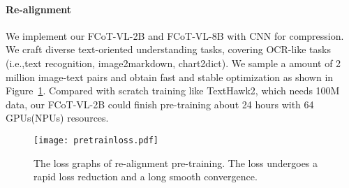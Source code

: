 

\paragraph{Re-alignment}
We implement our FCoT-VL-2B and FCoT-VL-8B with CNN for compression. We craft diverse text-oriented understanding tasks, covering OCR-like tasks (i.e.,text recognition, image2markdown, chart2dict\cite{wei2023vary}). We sample a amount of 2 million image-text pairs and obtain fast and stable optimization as shown in Figure~\ref{fig:pretrain_loss}. Compared with scratch training like TextHawk2, which needs 100M data, our FCoT-VL-2B could finish pre-training about 24 hours with 64 GPUs(NPUs) resources.
\begin{table}[ht]
    \setlength{\tabcolsep}{1.5pt}
    \renewcommand{\arraystretch}{1.2}
    \centering
    \caption{The Performance of pretrain models under different compressing ratio.}
    \label{tab:pretrain_performance}
\end{table}
\begin{figure}[ht]
    \texttt{[image: pretrainloss.pdf]}
    \caption {The loss graphs of re-alignment pre-training. The loss undergoes a rapid loss reduction and a long smooth convergence.}
    \label{fig:pretrain_loss}
\end{figure}

